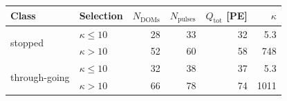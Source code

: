 \begin{tabular}{llrrrr}
\toprule
Class & Selection & $N_{\mathrm{DOMs}}$ & $N_{\mathrm{pulses}}$ & $Q_{\mathrm{tot}}$ [PE] & $\kappa$ \\
\midrule
\multirow{2}{*}{stopped} & $\kappa \leq 10$ & 28 & 33 & 32 & 5.3 \\
 & $\kappa > 10$ & 52 & 60 & 58 & 748 \\
\midrule
\multirow{2}{*}{through-going} & $\kappa \leq 10$ & 32 & 38 & 37 & 5.3 \\
 & $\kappa > 10$ & 66 & 78 & 74 & 1011 \\
\bottomrule
\end{tabular}
